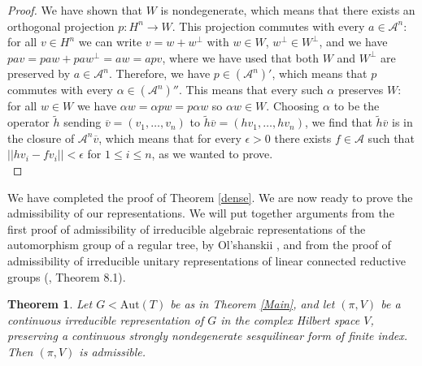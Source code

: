 \documentclass{article}
\theoremstyle{definition}
\theoremstyle{remark}
\theoremstyle{plain}
\newtheorem{thm}[dfn]{Theorem}
\begin{document}
\begin{proof}
     We have shown that $W$ is nondegenerate, which means that there exists an orthogonal projection $p: H^n\rightarrow W$. This projection commutes with every $a\in\mathcal{A}^n$: for all $v\in H^n$ we can write $v=w+w^\perp$ with $w\in W$, $w^\perp\in W^\perp$, and we have $pav=paw+paw^\perp=aw=apv$, where we have used that both $W$ and $W^\perp$ are preserved by $a\in\mathcal{A}^n$. Therefore, we have $p\in(\mathcal{A}^n)'$, which means that $p$ commutes with every $\alpha\in(\mathcal{A}^n)''$. This means that every such $\alpha$ preserves $W$: for all $w\in W$ we have $\alpha w=\alpha pw=p\alpha w$ so $\alpha w\in W$. Choosing $\alpha$ to be the operator $\widetilde{h}$ sending $\overline{v}=(v_1,\ldots,v_n)$ to $\widetilde{h}\overline{v}=(hv_1,\ldots,hv_n)$, we find that $\widetilde{h}\overline{v}$ is in the closure of $\mathcal{A}^n\overline{v}$, which means that for every $\epsilon>0$ there exists $f\in\mathcal{A}$ such that $||hv_i-fv_i||<\epsilon$ for $1\leq i\leq n$, as we wanted to prove. \\
\end{proof}

We have completed the proof of Theorem \ref{dense}. We are now ready to prove the admissibility of our representations. We will put together arguments from the first proof of admissibility of irreducible algebraic representations of the automorphism group of a regular tree, by Ol'shanskii \cite{olsh2}, and from the proof of admissibility of irreducible unitary representations of linear connected reductive groups (\cite{knapp2}, Theorem 8.1). \\

\begin{thm} \label{admissC}
    Let $G<\mathrm{Aut}(T)$ be as in Theorem \ref{Main}, and let $(\pi,V)$ be a continuous irreducible representation of $G$ in the complex Hilbert space $V$, preserving a continuous strongly nondegenerate sesquilinear form of finite index. Then $(\pi,V)$ is admissible.
\end{thm}
\end{document}
